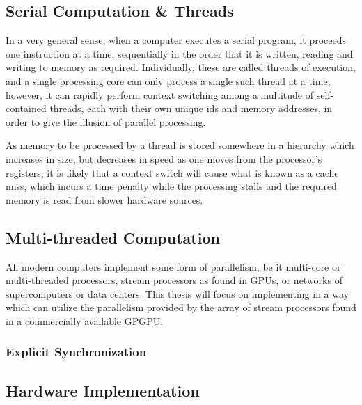 %

%
%

%
\subsection{Serial Computation \& Threads}
In a very general sense, when a computer executes a serial program, it proceeds one instruction at a time, sequentially in the order that it is written, reading and writing to memory as required. Individually, these are called threads of execution, and a single processing core can only process a single such thread at a time, however, it can rapidly perform context switching among a multitude of self-contained threads, each with their own unique ids and memory addresses, in order to give the illusion of parallel processing.

As memory to be processed by a thread is stored somewhere in a hierarchy which increases in size, but decreases in speed as one moves from the processor's registers, it is likely that a context switch will cause what is known as a cache miss, which incurs a time penalty while the processing stalls and the required memory is read from slower hardware sources.


%
\subsection{Multi-threaded Computation}
All modern computers implement some form of parallelism, be it multi-core or multi-threaded processors, stream processors as found in GPUs, or networks of supercomputers or data centers. This thesis will focus on implementing  in a way which can utilize the parallelism provided by the array of stream processors found in a commercially available GPGPU.
\subsubsection{Explicit Synchronization}%
%
\subsection{Hardware Implementation}%
%
%
%

